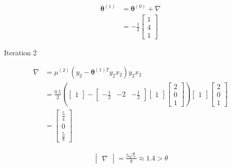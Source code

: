 \documentclass[a4paper, 10pt, twoside]{article}
\begin{document}
\begin{enumerate}[a)]
          \begin{align*}
              \bm{\theta}^{(1)}
               & = \bm{\theta}^{(0)} + \nabla \\
               & = -\frac{1}{2}
              \begin{bmatrix}
                  1 \\ 4 \\ 1
              \end{bmatrix}
          \end{align*}

          Iteration 2

          \begin{align*}
              \nabla
               & =
              \mu^{(2)}(y_2-\bm{\theta}^{(1)T}y_2x_2)y_2x_2 \\
               & =
              \frac{0.5}{2}
              \left(
              \begin{bmatrix}
                      1
                  \end{bmatrix}
              -
              \begin{bmatrix}
                      -\frac{1}{2} & -2 & -\frac{1}{2}
                  \end{bmatrix}
              \begin{bmatrix}
                      1
                  \end{bmatrix}
              \begin{bmatrix}
                      2 \\ 0 \\ 1
                  \end{bmatrix}
              \right)
              \begin{bmatrix}
                  1
              \end{bmatrix}
              \begin{bmatrix}
                  2 \\ 0 \\ 1
              \end{bmatrix}                    \\
               & =
              \begin{bmatrix}
                  \frac{5}{4} \\ 0 \\ \frac{5}{8}
              \end{bmatrix}
          \end{align*}

          \begin{align*}
              \begin{vmatrix}
                  \nabla
              \end{vmatrix} = \frac{5\sqrt{5}}{8} \approx 1.4 > \theta
          \end{align*}


\end{enumerate}
\end{document}
